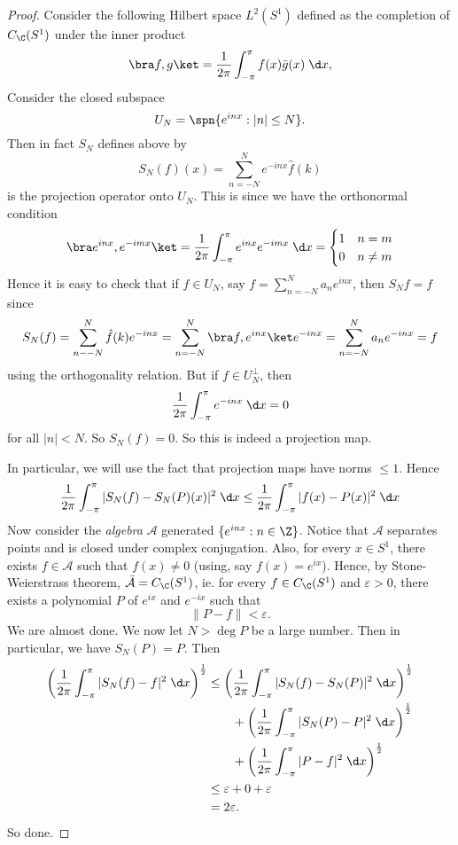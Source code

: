 \documentclass[a4paper]{article}
\begin{document}
\begin{proof}
  Consider the following Hilbert space $L^2(S^1)$ defined as the completion of $C_{\C}(S^1)$ under the inner product
  \[
    \bra f, g\ket = \frac{1}{2\pi} \int_{-\pi}^\pi f(x) \bar{g}(x) \;\d x,
  \]
  Consider the closed subspace
  \[
    U_N = \spn \{e^{inx}: |n| \leq N\}.
  \]
  Then in fact $S_N$ defines above by
  \[
    S_N(f)(x) = \sum_{n = -N}^N e^{-inx} \hat{f}(k)
  \]
  is the projection operator onto $U_N$. This is since we have the orthonormal condition
  \[
    \bra e^{inx}, e^{-imx}\ket = \frac{1}{2\pi} \int_{-\pi}^\pi e^{inx}e^{-imx}\;\d x =
    \begin{cases}
      1 & n = m\\
      0 & n \not= m
    \end{cases}
  \]
  Hence it is easy to check that if $f \in U_N$, say $f = \sum_{n = -N}^N a_n e^{inx}$, then $S_N f = f$ since
  \[
    S_N (f) = \sum_{n - -N}^N \hat{f}(k) e^{-inx} = \sum_{n = -N}^N \bra f, e^{inx}\ket e^{-inx} = \sum_{n = -N}^N a_n e^{-inx} = f
  \]
  using the orthogonality relation. But if $f \in U_N^\perp$, then
  \[
    \frac{1}{2\pi} \int_{-\pi}^\pi e^{-inx}\;\d x = 0
  \]
  for all $|n| < N$. So $S_N(f) = 0$. So this is indeed a projection map.

  In particular, we will use the fact that projection maps have norms $\leq 1$. Hence
  \[
    \frac{1}{2\pi}\int_{-\pi}^\pi |S_N(f) - S_N(P)(x)|^2 \;\d x \leq \frac{1}{2\pi} \int_{-\pi}^\pi |f(x) - P(x)|^2 \;\d x
  \]
  Now consider the \emph{algebra} $\mathcal{A}$ generated $\{e^{inx}: n \in \Z\}$. Notice that $\mathcal{A}$ separates points and is closed under complex conjugation. Also, for every $x \in S^1$, there exists $f \in \mathcal{A}$ such that $f(x) \not= 0$ (using, say $f(x) = e^{ix}$). Hence, by Stone-Weierstrass theorem, $\bar{\mathcal{A}} = C_\C(S^1)$, ie. for every $f \in C_\C (S^1)$ and $\varepsilon > 0$, there exists a polynomial $P$ of $e^{ix}$ and $e^{-ix}$ such that
  \[
    \|P - f\| < \varepsilon.
  \]
  We are almost done. We now let $N > \deg P$ be a large number. Then in particular, we have $S_N(P) = P$. Then
  \begin{align*}
    \left(\frac{1}{2\pi} \int_{-\pi}^\pi |S_N(f) - f|^2 \;\d x\right)^{\frac{1}{2}} &\leq \left(\frac{1}{2\pi}\int_{-\pi}^\pi |S_N(f) - S_N(P)|^2 \;\d x\right)^{\frac{1}{2}} \\
    &\quad \quad+ \left(\frac{1}{2\pi} \int_{-\pi}^\pi |S_N(P) - P|^2 \;\d x\right)^{\frac{1}{2}}\\
    &\quad \quad+ \left(\frac{1}{2\pi} \int_{-\pi}^\pi |P - f|^2 \;\d x\right)^{\frac{1}{2}}\\
    &\leq \varepsilon + 0 + \varepsilon\\
    &= 2\varepsilon.
  \end{align*}
  So done.
\end{proof}
\end{document}
